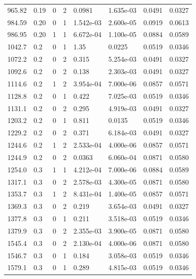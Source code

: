 \documentclass[preview]{standalone}
\begin{document}
{{{\begin{tabular}{L{1.2cm}C{1.2cm} C{0.3cm}C{0.5cm} C{1.4cm}C{1.4cm} C{1.4cm}C{1.4cm}}
  965.82  &  0.19  & 0     &  2 &  0.0981  & 1.635e-03  & 0.0491 &  0.0327   \\ 
  984.59  &  0.20  & 0     &  1 &  1.542e-03  & 2.600e-05  & 0.0919 &  0.0613   \\ 
  986.95  &  0.20  & 1     &  1 &  6.672e-04  & 1.100e-05  & 0.0884 &  0.0589   \\ 
  1042.7  &   0.2  & 0     &  1 &  1.35  & 0.0225  & 0.0519 &  0.0346   \\ 
  1072.2  &   0.2  & 0     &  2 &  0.315  & 5.254e-03  & 0.0491 &  0.0327   \\ 
  1092.6  &   0.2  & 0     &  2 &  0.138  & 2.303e-03  & 0.0491 &  0.0327   \\ 
  1114.6  &   0.2  & 1     &  2 &  3.954e-04  & 7.000e-06  & 0.0857 &  0.0571   \\ 
  1128.8  &   0.2  & 0     &  1 &  0.422  & 7.025e-03  & 0.0519 &  0.0346   \\ 
  1131.1  &   0.2  & 0     &  2 &  0.295  & 4.919e-03  & 0.0491 &  0.0327   \\ 
  1203.2  &   0.2  & 0     &  1 &  0.811  & 0.0135  & 0.0519 &  0.0346   \\ 
  1229.2  &   0.2  & 0     &  2 &  0.371  & 6.184e-03  & 0.0491 &  0.0327   \\ 
  1244.6  &   0.2  & 1     &  2 &  2.533e-04  & 4.000e-06  & 0.0857 &  0.0571   \\ 
  1244.9  &   0.2  & 0     &  2 &  0.0363  & 6.060e-04  & 0.0871 &  0.0580   \\ 
  1254.0  &   0.3  & 1     &  1 &  4.212e-04  & 7.000e-06  & 0.0884 &  0.0589   \\ 
  1317.1  &   0.3  & 0     &  2 &  2.578e-03  & 4.300e-05  & 0.0871 &  0.0580   \\ 
  1353.7  &   0.3  & 1     &  2 &  8.431e-04  & 1.400e-05  & 0.0857 &  0.0571   \\ 
  1369.3  &   0.3  & 0     &  2 &  0.219  & 3.654e-03  & 0.0491 &  0.0327   \\ 
  1377.8  &   0.3  & 0     &  1 &  0.211  & 3.518e-03  & 0.0519 &  0.0346   \\ 
  1379.9  &   0.3  & 0     &  2 &  2.355e-03  & 3.900e-05  & 0.0871 &  0.0580   \\ 
  1545.4  &   0.3  & 0     &  2 &  2.130e-04  & 4.000e-06  & 0.0871 &  0.0580   \\ 
  1546.7  &   0.3  & 0     &  1 &  0.184  & 3.058e-03  & 0.0519 &  0.0346   \\ 
  1579.1  &   0.3  & 0     &  1 &  0.289  & 4.815e-03  & 0.0519 &  0.0346   \\ 

\end{tabular}}}}
\end{document}
